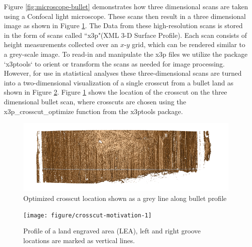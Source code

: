 \documentclass[12pt]{article}\usepackage[]{graphicx}\usepackage[]{color}
\makeatletter
\def\maxwidth{ %
  \ifdim\Gin@nat@width>\linewidth
    \linewidth
  \else
    \Gin@nat@width
  \fi
}
\newenvironment{knitrout}{}{} %
\theoremstyle{nonumberplain}
\makeatother
\begin{document}
Figure \ref{fig:microscope-bullet} demonstrates how three dimensional scans are taken using a Confocal light microscope. These scans then result in a three dimensional image as shown in Figure \ref{fig:crosscut-location-example}. The Data from these high-resolution scans is stored in the form of scans called ``x3p"(XML 3-D Surface Profile). Each scan consists of height measurements collected over an $x$-$y$ grid, which can be rendered similar to a grey-scale image. To read-in and manipulate the x3p files we utilize the package `x3ptools` to orient or transform the scans as needed for image processing. However, for use in statistical analyses these three-dimensional scans are  turned into a two-dimensional visualization of a single crosscut from a bullet land as shown in Figure \ref{fig:crosscut-motivation}. Figure \ref{fig:crosscut-location-example} shows the location of the crosscut on the three dimensional bullet scan, where crosscuts are chosen using the x3p\_crosscut\_optimize function from the x3ptools package. 

\begin{knitrout}
\color{fgcolor}\begin{figure}[H]

{\centering \includegraphics[width=\maxwidth]{../images/crosscut-location-example} 

}

\caption[Optimized crosscut location shown as a grey line along bullet profile]{Optimized crosscut location shown as a grey line along bullet profile}\label{fig:crosscut-location-example}
\end{figure}


\end{knitrout}



\begin{knitrout}
\color{fgcolor}\begin{figure}[H]

{\centering \texttt{[image: figure/crosscut-motivation-1]} 

}

\caption[Profile of a land engraved area (LEA), left and right groove locations are marked as vertical lines]{Profile of a land engraved area (LEA), left and right groove locations are marked as vertical lines.}\label{fig:crosscut-motivation}
\end{figure}


\end{knitrout}
\end{document}
